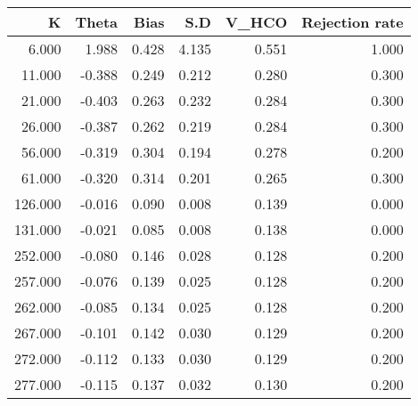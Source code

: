 \begin{tabular}{rrrrrr}
  \hline
K & Theta & Bias & S.D & V\_HCO & Rejection rate \\ 
  \hline
6.000 & 1.988 & 0.428 & 4.135 & 0.551 & 1.000 \\ 
  11.000 & -0.388 & 0.249 & 0.212 & 0.280 & 0.300 \\ 
  21.000 & -0.403 & 0.263 & 0.232 & 0.284 & 0.300 \\ 
  26.000 & -0.387 & 0.262 & 0.219 & 0.284 & 0.300 \\ 
  56.000 & -0.319 & 0.304 & 0.194 & 0.278 & 0.200 \\ 
  61.000 & -0.320 & 0.314 & 0.201 & 0.265 & 0.300 \\ 
  126.000 & -0.016 & 0.090 & 0.008 & 0.139 & 0.000 \\ 
  131.000 & -0.021 & 0.085 & 0.008 & 0.138 & 0.000 \\ 
  252.000 & -0.080 & 0.146 & 0.028 & 0.128 & 0.200 \\ 
  257.000 & -0.076 & 0.139 & 0.025 & 0.128 & 0.200 \\ 
  262.000 & -0.085 & 0.134 & 0.025 & 0.128 & 0.200 \\ 
  267.000 & -0.101 & 0.142 & 0.030 & 0.129 & 0.200 \\ 
  272.000 & -0.112 & 0.133 & 0.030 & 0.129 & 0.200 \\ 
  277.000 & -0.115 & 0.137 & 0.032 & 0.130 & 0.200 \\ 
   \hline
\end{tabular}
